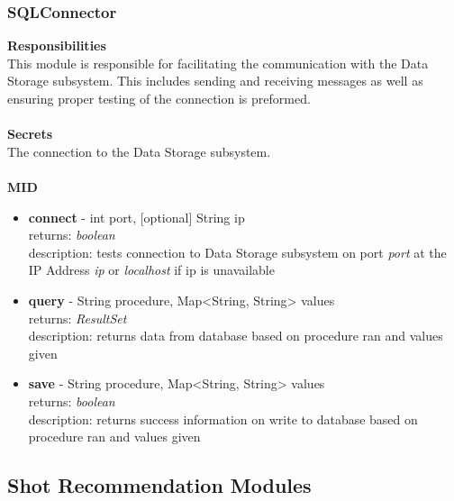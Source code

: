 \documentclass[11pt]{article}
\begin{document}
\subsubsection*{SQLConnector}
\textbf{Responsibilities} \\
This module is responsible for facilitating the communication with the Data Storage subsystem. This includes sending and receiving messages as well as ensuring proper testing of the connection is preformed. \\ \\
\textbf{Secrets} \\
The connection to the Data Storage subsystem. \\ \\
\textbf{MID}
\begin{itemize}
\item \textbf{connect} - int port, [optional] String ip \\ returns: \textit{boolean} \\ description: tests connection to Data Storage subsystem on port \textit{port} at the IP Address \textit{ip} or \textit{localhost} if ip is unavailable
\item \textbf{query} - String procedure, Map<String, String> values \\ returns: \textit{ResultSet} \\ description: returns data from database based on procedure ran and values given
\item \textbf{save} - String procedure, Map<String, String> values \\ returns: \textit{boolean} \\ description: returns success information on write to database based on procedure ran and values given
\end{itemize}

\subsection{Shot Recommendation Modules} %
\end{document}

